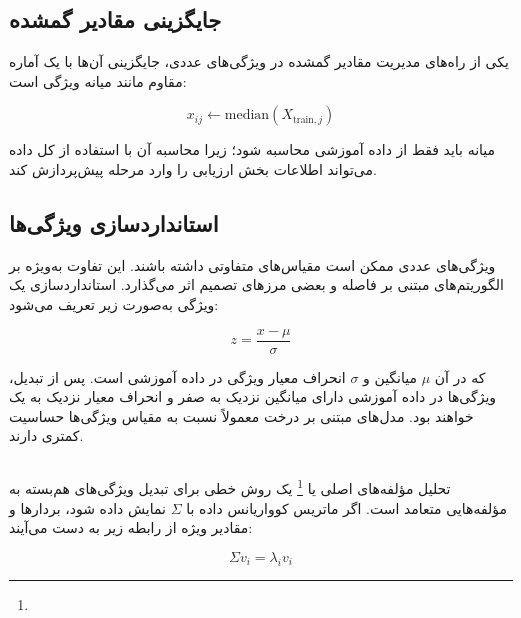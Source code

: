 \subsection{جایگزینی مقادیر گمشده}

یکی از راه‌های مدیریت مقادیر گمشده در ویژگی‌های عددی، جایگزینی آن‌ها با یک آماره مقاوم مانند میانه ویژگی است:

\begin{equation}
x_{ij}
\leftarrow
\mathrm{median}(X_{\mathrm{train},j})
\end{equation}

میانه باید فقط از داده آموزشی محاسبه شود؛ زیرا محاسبه آن با استفاده از کل داده می‌تواند اطلاعات بخش ارزیابی را وارد مرحله پیش‌پردازش کند.


\subsection{استانداردسازی ویژگی‌ها}

ویژگی‌های عددی ممکن است مقیاس‌های متفاوتی داشته باشند. این تفاوت به‌ویژه بر الگوریتم‌های مبتنی بر فاصله و بعضی مرزهای تصمیم اثر می‌گذارد. استانداردسازی یک ویژگی به‌صورت زیر تعریف می‌شود:

\begin{equation}
z
=
\frac{x-\mu}{\sigma}
\end{equation}

که در آن $\mu$ میانگین و $\sigma$ انحراف معیار ویژگی در داده آموزشی است. پس از تبدیل، ویژگی‌ها در داده آموزشی دارای میانگین نزدیک به صفر و انحراف معیار نزدیک به یک خواهند بود. مدل‌های مبتنی بر درخت معمولاً نسبت به مقیاس ویژگی‌ها حساسیت کمتری دارند.


\subsection{}

تحلیل مؤلفه‌های اصلی یا
\footnote{}
یک روش خطی برای تبدیل ویژگی‌های هم‌بسته به مؤلفه‌هایی متعامد است. اگر ماتریس کوواریانس داده با $\Sigma$ نمایش داده شود، بردارها و مقادیر ویژه از رابطه زیر به دست می‌آیند:

\begin{equation}
\Sigma v_i
=
\lambda_i v_i
\end{equation}

